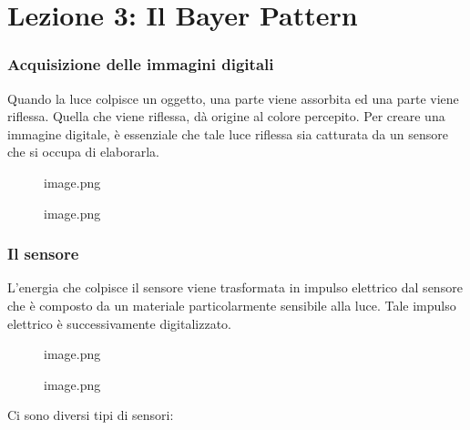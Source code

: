 \documentclass[
]{article}
\author{}
\date{}
\begin{document}
\hypertarget{lezione-3-il-bayer-pattern}{%
\section{Lezione 3: Il Bayer Pattern}\label{lezione-3-il-bayer-pattern}}

\hypertarget{acquisizione-delle-immagini-digitali}{%
\subsubsection{Acquisizione delle immagini digitali}\label{acquisizione-delle-immagini-digitali}}

Quando la luce colpisce un oggetto, una parte viene assorbita ed una parte viene riflessa. Quella che viene riflessa, dà origine al colore percepito.
Per creare una immagine digitale, è essenziale che tale luce riflessa sia catturata da un sensore che si occupa di elaborarla.

\begin{figure}
\centering
{image.png}
\caption{image.png}
\end{figure}

\hypertarget{il-sensore}{%
\subsubsection{Il sensore}\label{il-sensore}}

L'energia che colpisce il sensore viene trasformata in impulso elettrico dal sensore che è composto da un materiale particolarmente sensibile alla luce. Tale impulso elettrico è successivamente digitalizzato.

\begin{figure}
\centering
{image.png}
\caption{image.png}
\end{figure}

Ci sono diversi tipi di sensori:
\end{document}
